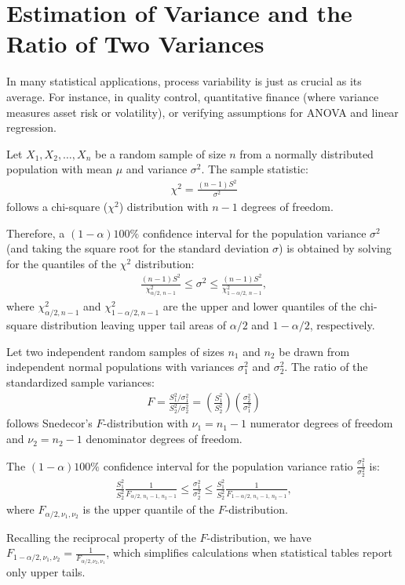 \section{Estimation of Variance and the Ratio of Two Variances}

In many statistical applications, process variability is just as crucial as its average. For instance, in quality control, quantitative finance (where variance measures asset risk or volatility), or verifying assumptions for ANOVA and linear regression.

\begin{teorema}
	Let $X_1, X_2, \ldots, X_n$ be a random sample of size $n$ from a normally distributed population with mean $\mu$ and variance $\sigma^2$. The sample statistic:
	\begin{align}
		\chi^2 = \frac{(n-1)S^2}{\sigma^2}
	\end{align}
	follows a chi-square ($\chi^2$) distribution with $n-1$ degrees of freedom.
	
	Therefore, a $(1-\alpha)100\%$ confidence interval for the population variance $\sigma^2$ (and taking the square root for the standard deviation $\sigma$) is obtained by solving for the quantiles of the $\chi^2$ distribution:
	\begin{align}
		\frac{(n-1)S^2}{\chi^2_{\alpha/2, \, n-1}} \leq \sigma^2 \leq \frac{(n-1)S^2}{\chi^2_{1-\alpha/2, \, n-1}},
	\end{align}
	where $\chi^2_{\alpha/2, n-1}$ and $\chi^2_{1-\alpha/2, n-1}$ are the upper and lower quantiles of the chi-square distribution leaving upper tail areas of $\alpha/2$ and $1-\alpha/2$, respectively.
\end{teorema}

\begin{teorema}
	Let two independent random samples of sizes $n_1$ and $n_2$ be drawn from independent normal populations with variances $\sigma_1^2$ and $\sigma_2^2$. The ratio of the standardized sample variances:
	\begin{align}
		F = \frac{S_1^2 / \sigma_1^2}{S_2^2 / \sigma_2^2} = \left(\frac{S_1^2}{S_2^2}\right)\left(\frac{\sigma_2^2}{\sigma_1^2}\right)
	\end{align}
	follows Snedecor's $F$-distribution with $\nu_1 = n_1 - 1$ numerator degrees of freedom and $\nu_2 = n_2 - 1$ denominator degrees of freedom.
	
	The $(1-\alpha)100\%$ confidence interval for the population variance ratio $\frac{\sigma_1^2}{\sigma_2^2}$ is:
	\begin{align}
		\frac{S_1^2}{S_2^2} \frac{1}{F_{\alpha/2, \, n_1-1, \, n_2-1}} \leq \frac{\sigma_1^2}{\sigma_2^2} \leq \frac{S_1^2}{S_2^2} \frac{1}{F_{1-\alpha/2, \, n_1-1, \, n_2-1}},
	\end{align}
	where $F_{\alpha/2, \nu_1, \nu_2}$ is the upper quantile of the $F$-distribution. 
	
	Recalling the reciprocal property of the $F$-distribution, we have $F_{1-\alpha/2, \nu_1, \nu_2} = \frac{1}{F_{\alpha/2, \nu_2, \nu_1}}$, which simplifies calculations when statistical tables report only upper tails.
\end{teorema}
